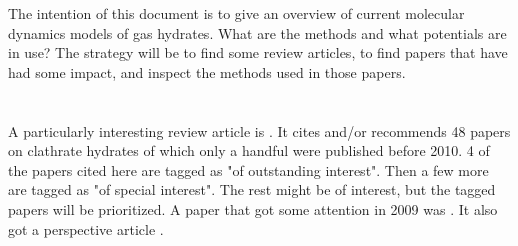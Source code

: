 \documentclass[a4paper]{article}
\begin{document}


The intention of this document is to give an overview of current molecular dynamics models of gas hydrates. What are the methods and what potentials are in use? The strategy will be to find some review articles, to find papers that have had some impact, and inspect the methods used in those papers. 

\section{}
A particularly interesting review article is \cite{Barnes2013}. It cites and/or recommends 48 papers on clathrate hydrates of which only a handful were published before 2010. 4 of the papers cited here are tagged as "of outstanding interest". Then a few more are tagged as "of special interest". The rest might be of interest, but the tagged papers will be prioritized. 
A paper that got some attention in 2009 was \cite{Walsh2009}. It also got a perspective article \cite{Debenedetti2009}.


\end{document}
